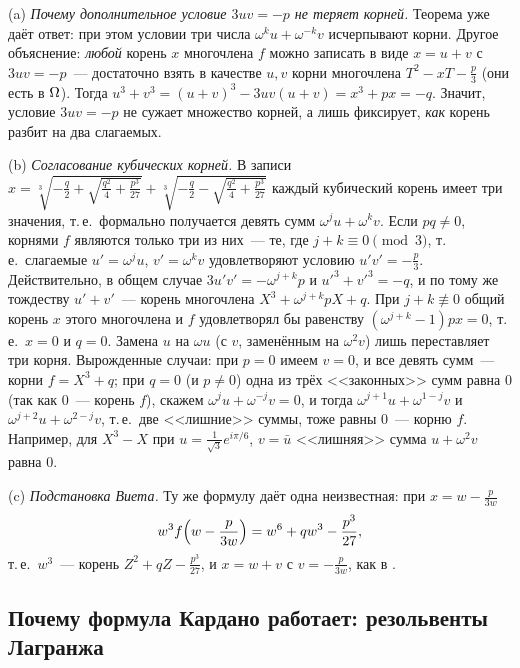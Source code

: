 \begin{remark}[4.7c]
(a) \emph{Почему дополнительное условие $3uv=-p$ не теряет корней.} Теорема  уже даёт ответ: при этом условии три
числа $\omega^ku+\omega^{-k}v$ исчерпывают корни. Другое объяснение: \emph{любой} корень $x$ многочлена $f$ можно записать в
виде $x=u+v$ с $3uv=-p$~--- достаточно взять в качестве $u,v$ корни многочлена $T^2-xT-\frac p3$ (они есть в $\Omega$). Тогда
$u^3+v^3=(u+v)^3-3uv(u+v)=x^3+px=-q$. Значит, условие $3uv=-p$ не сужает множество корней, а лишь фиксирует, \emph{как}
корень разбит на два слагаемых.

(b) \emph{Согласование кубических корней.} В записи
$x=\sqrt[3]{-\frac q2+\sqrt{\frac{q^2}4+\frac{p^3}{27}}}+\sqrt[3]{-\frac q2-\sqrt{\frac{q^2}4+\frac{p^3}{27}}}$ каждый кубический корень имеет три
значения, т.\,е.\ формально получается девять сумм $\omega^ju+\omega^kv$. Если $pq\ne0$, корнями $f$ являются только три из
них~--- те, где $j+k\equiv0\pmod 3$, т.\,е.\ слагаемые $u'=\omega^ju$, $v'=\omega^kv$ удовлетворяют условию $u'v'=-\frac p3$. Действительно,
в общем случае $3u'v'=-\omega^{j+k}p$ и $u'^3+v'^3=-q$, и по тому же тождеству $u'+v'$~--- корень многочлена $X^3+\omega^{j+k}pX+q$. При
$j+k\not\equiv0$ общий корень $x$ этого многочлена и $f$ удовлетворял бы равенству $(\omega^{j+k}-1)px=0$, т.\,е.\ $x=0$ и $q=0$.
Замена $u$ на $\omega u$ (с $v$, заменённым на $\omega^2v$) лишь переставляет три корня. Вырожденные случаи: при $p=0$ имеем $v=0$, и все девять сумм~---
корни $f=X^3+q$; при $q=0$ (и $p\ne0$) одна из трёх <<законных>> сумм равна $0$ (так как $0$~--- корень $f$), скажем $\omega^ju+\omega^{-j}v=0$, и тогда
$\omega^{j+1}u+\omega^{1-j}v$ и $\omega^{j+2}u+\omega^{2-j}v$, т.\,е.\ две <<лишние>> суммы, тоже равны $0$~--- корню $f$. Например, для $X^3-X$
при $u=\frac1{\sqrt3}e^{i\pi/6}$, $v=\bar u$ <<лишняя>> сумма $u+\omega^2v$ равна $0$.

(c) \emph{Подстановка Виета.} Ту же формулу даёт одна неизвестная: при $x=w-\frac p{3w}$
\[
w^3f\Bigl(w-\frac p{3w}\Bigr)=w^6+qw^3-\frac{p^3}{27},
\]
т.\,е.\ $w^3$~--- корень $Z^2+qZ-\frac{p^3}{27}$, и $x=w+v$ с $v=-\frac p{3w}$, как в .
\end{remark}

\subsection*{Почему формула Кардано работает: резольвенты Лагранжа}

